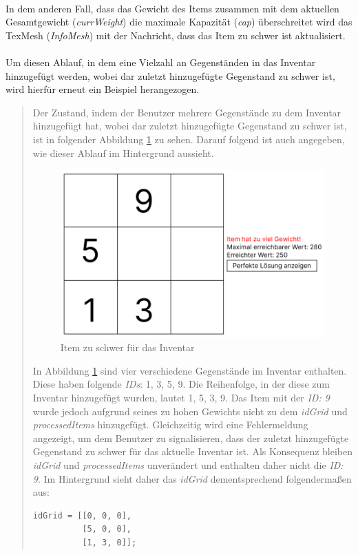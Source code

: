 \\
In dem anderen Fall, dass das Gewicht des Items zusammen mit dem aktuellen Gesamtgewicht (\textit{currWeight}) die maximale
Kapazität (\textit{cap}) überschreitet wird das TexMesh (\textit{InfoMesh}) mit der Nachricht, dass das Item zu schwer ist
aktualisiert.\\
\\
Um diesen Ablauf, in dem eine Vielzahl an Gegenständen in das Inventar hinzugefügt werden, wobei dar zuletzt hinzugefügte
Gegenstand zu schwer ist, wird hierfür erneut ein Beispiel herangezogen.

\begin{quote}
Der Zustand, indem der Benutzer mehrere Gegenstände zu dem Inventar hinzugefügt hat, wobei dar zuletzt hinzugefügte
Gegenstand zu schwer ist, ist in folgender Abbildung \ref{fig:controller_itemToHeavy} zu sehen. Darauf folgend ist auch
angegeben, wie dieser Ablauf im Hintergrund aussieht.

\begin{figure}[H]
    \centering
    \includegraphics[scale=0.6]{images/itemToHeavy}
    \caption{Item zu schwer für das Inventar}
    \label{fig:controller_itemToHeavy}
\end{figure}

In Abbildung \ref{fig:controller_itemToHeavy} sind vier verschiedene Gegenstände im Inventar enthalten. Diese haben folgende
\textit{IDs}: 1, 3, 5, 9. Die Reihenfolge, in der diese zum Inventar hinzugefügt wurden, lautet 1, 5, 3, 9. Das Item mit der
\textit{ID: 9} wurde jedoch aufgrund seines zu hohen Gewichts nicht zu dem \textit{idGrid} und \textit{processedItems}
hinzugefügt. Gleichzeitig wird eine Fehlermeldung angezeigt, um dem Benutzer zu signalisieren, dass der zuletzt hinzugefügte
Gegenstand zu schwer für das aktuelle Inventar ist. Als Konsequenz bleiben \textit{idGrid} und \textit{processedItems}
unverändert und enthalten daher nicht die \textit{ID: 9}. Im Hintergrund sieht daher das \textit{idGrid} dementsprechend folgendermaßen aus:
\begin{lstlisting}[style=csharp label=code:controller_savedIDs]
idGrid = [[0, 0, 0],
          [5, 0, 0],
          [1, 3, 0]];
\end{lstlisting}


\end{quote}
